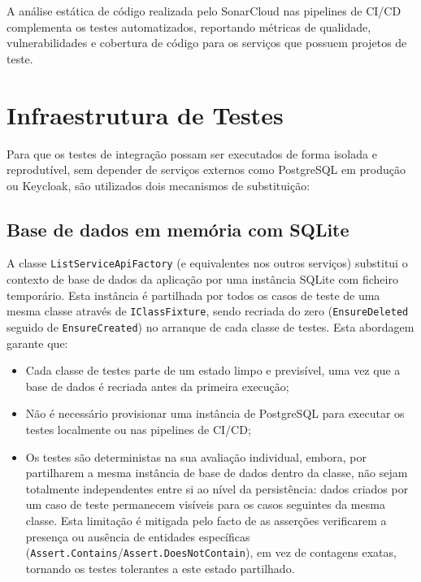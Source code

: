 A análise estática de código realizada pelo SonarCloud nas pipelines de \ac{CI/CD} complementa os testes automatizados, reportando métricas de qualidade, vulnerabilidades e cobertura de código para os serviços que possuem projetos de teste.

\section{Infraestrutura de Testes}
\label{sec:6.2}

Para que os testes de integração possam ser executados de forma isolada e reprodutível, sem depender de serviços externos como PostgreSQL em produção ou Keycloak, são utilizados dois mecanismos de substituição:

\subsection{Base de dados em memória com SQLite}
\label{sec:6.2.1}

A classe \texttt{ListServiceApiFactory} (e equivalentes nos outros serviços) substitui o contexto de base de dados da aplicação por uma instância SQLite com ficheiro temporário. Esta instância é partilhada por todos os casos de teste de uma mesma classe através de \texttt{IClassFixture}, sendo recriada do zero (\texttt{EnsureDeleted} seguido de \texttt{EnsureCreated}) no arranque de cada classe de testes. Esta abordagem garante que:

\begin{itemize}
    \item Cada classe de testes parte de um estado limpo e previsível, uma vez que a base de dados é recriada antes da primeira execução;
    \item Não é necessário provisionar uma instância de PostgreSQL para executar os testes localmente ou nas pipelines de \ac{CI/CD};
    \item Os testes são deterministas na sua avaliação individual, embora, por partilharem a mesma instância de base de dados dentro da classe, não sejam totalmente independentes entre si ao nível da persistência: dados criados por um caso de teste permanecem visíveis para os casos seguintes da mesma classe. Esta limitação é mitigada pelo facto de as asserções verificarem a presença ou ausência de entidades específicas (\texttt{Assert.Contains}/\texttt{Assert.DoesNotContain}), em vez de contagens exatas, tornando os testes tolerantes a este estado partilhado.
\end{itemize}

